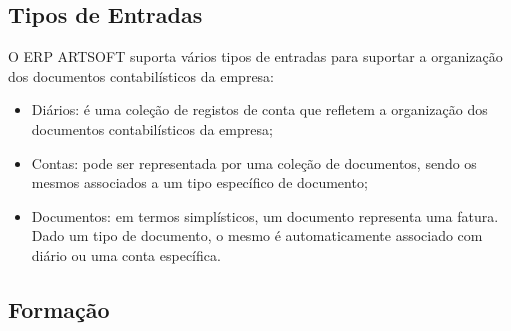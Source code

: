 \documentclass[sigplan]{acmart}
\begin{document}
\subsection{Tipos de Entradas}

O ERP ARTSOFT suporta vários tipos de entradas para suportar a organização dos documentos contabilísticos da empresa:

\begin{itemize}
  \item Diários: é uma coleção de registos de conta que refletem a organização dos documentos contabilísticos da empresa;
  \item Contas: pode ser representada por uma coleção de documentos, sendo os mesmos associados a um tipo específico de documento;
  \item Documentos: em termos simplísticos, um documento representa uma fatura. Dado um tipo de documento, o mesmo é automaticamente associado com diário ou uma conta específica.
\end{itemize}

\subsection{Formação}
\end{document}
